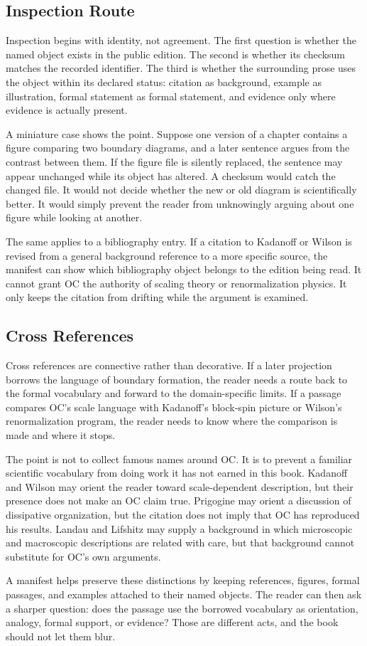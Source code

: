 \documentclass[11pt,a4paper,openany]{book}
\begin{document}
\subsection{Inspection Route}
Inspection begins with identity, not agreement. The first question is whether the named object exists in the public edition. The second is whether its checksum matches the recorded identifier. The third is whether the surrounding prose uses the object within its declared status: citation as background, example as illustration, formal statement as formal statement, and evidence only where evidence is actually present. \cite{kadanoff_scaling,wilson_renormalization}\par
A miniature case shows the point. Suppose one version of a chapter contains a figure comparing two boundary diagrams, and a later sentence argues from the contrast between them. If the figure file is silently replaced, the sentence may appear unchanged while its object has altered. A checksum would catch the changed file. It would not decide whether the new or old diagram is scientifically better. It would simply prevent the reader from unknowingly arguing about one figure while looking at another.\par
The same applies to a bibliography entry. If a citation to Kadanoff or Wilson is revised from a general background reference to a more specific source, the manifest can show which bibliography object belongs to the edition being read. It cannot grant OC the authority of scaling theory or renormalization physics. It only keeps the citation from drifting while the argument is examined.\par
\subsection{Cross References}
Cross references are connective rather than decorative. If a later projection borrows the language of boundary formation, the reader needs a route back to the formal vocabulary and forward to the domain-specific limits. If a passage compares OC's scale language with Kadanoff's block-spin picture or Wilson's renormalization program, the reader needs to know where the comparison is made and where it stops. \cite{kadanoff_scaling,wilson_renormalization}\par
The point is not to collect famous names around OC. It is to prevent a familiar scientific vocabulary from doing work it has not earned in this book. Kadanoff and Wilson may orient the reader toward scale-dependent description, but their presence does not make an OC claim true. Prigogine may orient a discussion of dissipative organization, but the citation does not imply that OC has reproduced his results. Landau and Lifshitz may supply a background in which microscopic and macroscopic descriptions are related with care, but that background cannot substitute for OC's own arguments.\par
A manifest helps preserve these distinctions by keeping references, figures, formal passages, and examples attached to their named objects. The reader can then ask a sharper question: does the passage use the borrowed vocabulary as orientation, analogy, formal support, or evidence? Those are different acts, and the book should not let them blur.\par
\end{document}
